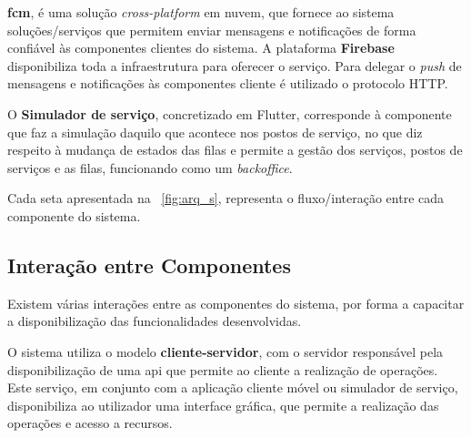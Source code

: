 \textbf{\acrfull{fcm}}, é uma solução \textit{cross-platform} em nuvem, que fornece ao sistema soluções/serviços que permitem enviar mensagens e notificações de forma confiável às componentes clientes do sistema. A plataforma \textbf{Firebase} disponibiliza toda a infraestrutura para oferecer o serviço.
Para delegar o \textit{push} de mensagens e notificações às componentes cliente é utilizado o protocolo HTTP.

O \textbf{Simulador de serviço}, concretizado em Flutter, corresponde à componente que faz a simulação daquilo que acontece nos postos de serviço, no que diz respeito à mudança de estados das filas e permite a gestão dos serviços, postos de serviços e as filas, funcionando como um \textit{backoffice}.

Cada seta apresentada na \figurename~\ref{fig:arq_s}, representa o fluxo/interação entre cada componente do sistema.

\subsection{Interação entre Componentes}
\label{sec:arquitetura}
Existem várias interações entre as componentes do sistema, por forma a capacitar a disponibilização das funcionalidades desenvolvidas.

O sistema utiliza o modelo \textbf{cliente-servidor}, com o servidor responsável pela disponibilização de uma \acrshort{api} que permite ao cliente a realização de operações. Este serviço, em conjunto com a aplicação cliente móvel ou simulador de serviço, disponibiliza ao utilizador uma interface gráfica, que permite a realização das operações e acesso a recursos.

